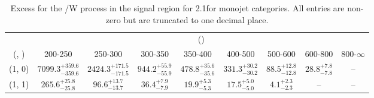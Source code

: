 \begin{table}[h!]
\tiny
\centering
\caption{Excess for the \ttbar/W process in the signal region for 2.1\ifb for monojet categories. All entries are non-zero but are truncated to one decimal place.\label{tab:excesssep_sig_ttw_mono}}
\begin{tabular}
{ccccccccc}
	\hline\hline
	& \multicolumn{8}{c}{\scalht (\gev)} \\ 
	 (\njet,  \nb) & 200-250 & 250-300 & 300-350 & 350-400 & 400-500 & 500-600 & 600-800 & 800-$\infty$ \\ [0.8ex] 
\hline
	(1, 0) & $7099.3^{+ 359.6 }_{- 359.6 }$ & $2424.3^{+ 171.5 }_{- 171.5 }$ & $944.2^{+ 55.9 }_{- 55.9 }$ & $478.8^{+ 35.6 }_{- 35.6 }$ & $331.3^{+ 30.2 }_{- 30.2 }$ & $88.5^{+ 12.8 }_{- 12.8 }$ & $28.8^{+ 7.8 }_{- 7.8 }$ & -- \\[0.5ex] 
	(1, 1) & $265.6^{+ 25.8 }_{- 25.8 }$ & $96.6^{+ 13.7 }_{- 13.7 }$ & $36.4^{+ 7.9 }_{- 7.9 }$ & $19.9^{+ 5.3 }_{- 5.3 }$ & $17.5^{+ 5.0 }_{- 5.0 }$ & $4.1^{+ 2.3 }_{- 2.3 }$ & -- & -- \\[0.5ex] 
	\hline
	\hline
\end{tabular}
\end{table}
